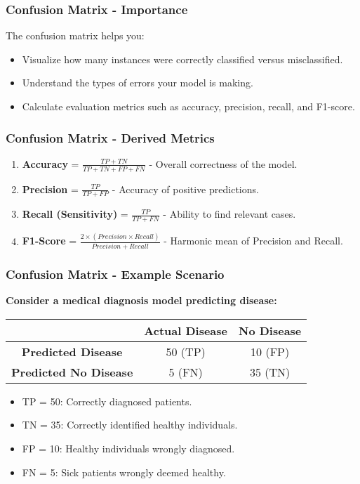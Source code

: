 \documentclass[aspectratio=169]{beamer}
\begin{document}
\begin{frame}[fragile]
    \frametitle{Confusion Matrix - Importance}
    The confusion matrix helps you:
    \begin{itemize}
        \item Visualize how many instances were correctly classified versus misclassified.
        \item Understand the types of errors your model is making.
        \item Calculate evaluation metrics such as accuracy, precision, recall, and F1-score.
    \end{itemize}
\end{frame}

\begin{frame}[fragile]
    \frametitle{Confusion Matrix - Derived Metrics}
    \begin{enumerate}
        \item \textbf{Accuracy} = \(\frac{TP + TN}{TP + TN + FP + FN}\) - Overall correctness of the model.
        \item \textbf{Precision} = \(\frac{TP}{TP + FP}\) - Accuracy of positive predictions.
        \item \textbf{Recall (Sensitivity)} = \(\frac{TP}{TP + FN}\) - Ability to find relevant cases.
        \item \textbf{F1-Score} = \(\frac{2 \times (Precision \times Recall)}{Precision + Recall}\) - Harmonic mean of Precision and Recall.
    \end{enumerate}
\end{frame}

\begin{frame}[fragile]
    \frametitle{Confusion Matrix - Example Scenario}
    \textbf{Consider a medical diagnosis model predicting disease:}

    \begin{center}
        \begin{tabular}{|c|c|c|}
            \hline
            & \textbf{Actual Disease} & \textbf{No Disease} \\
            \hline
            \textbf{Predicted Disease} & 50 (TP) & 10 (FP) \\
            \hline
            \textbf{Predicted No Disease} & 5 (FN) & 35 (TN) \\
            \hline
        \end{tabular}
    \end{center}
    
    \begin{itemize}
        \item TP = 50: Correctly diagnosed patients.
        \item TN = 35: Correctly identified healthy individuals.
        \item FP = 10: Healthy individuals wrongly diagnosed.
        \item FN = 5: Sick patients wrongly deemed healthy.
    \end{itemize}
\end{frame}
\end{document}
